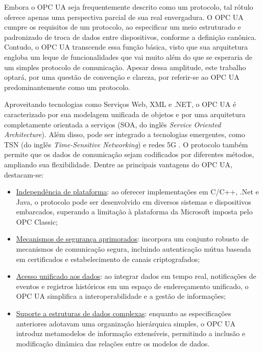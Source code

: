         Embora o OPC UA seja frequentemente descrito como um protocolo, tal rótulo oferece apenas uma perspectiva parcial de sua real envergadura. O OPC UA cumpre os requisitos de um protocolo, ao especificar um meio estruturado e padronizado de troca de dados entre dispositivos, conforme a definição canônica. Contudo, o OPC UA transcende essa função básica, visto que sua arquitetura engloba um leque de funcionalidades que vai muito além do que se esperaria de um simples protocolo de comunicação. Apesar dessa amplitude, este trabalho optará, por uma questão de convenção e clareza, por referir-se ao OPC UA predominantemente como um protocolo.

        Aproveitando tecnologias como Serviços Web, XML e .NET, o OPC UA é caracterizado por sua modelagem unificada de objetos e por uma arquitetura completamente orientada a serviços (SOA, do inglês \textit{Service Oriented Architecture}). Além disso, pode ser integrado a tecnologias emergentes, como TSN (do inglês \textit{Time-Sensitive Networking}) e redes 5G \cite{han2022}. O protocolo também permite que os dados de comunicação sejam codificados por diferentes métodos, ampliando sua flexibilidade. Dentre as principais vantagens do OPC UA, destacam-se:
        
        \begin{itemize}
            \item \underline{Independência de plataforma}: ao oferecer implementações em C/C++, .Net e Java, o protocolo pode ser desenvolvido em diversos sistemas e dispositivos embarcados, superando a limitação à plataforma da Microsoft imposta pelo OPC Classic;
            \item \underline{Mecanismos de segurança aprimorados}: incorpora um conjunto robusto de mecanismos de comunicação segura, incluindo autenticação mútua baseada em certificados e estabelecimento de canais criptografados;
            \item \underline{Acesso unificado aos dados}: ao integrar dados em tempo real, notificações de eventos e registros históricos em um espaço de endereçamento unificado, o OPC UA simplifica a interoperabilidade e a gestão de informações;
            \item \underline{Suporte a estruturas de dados complexas}: enquanto as especificações anteriores adotavam uma organização hierárquica simples, o OPC UA introduz metamodelos de informação extensíveis, permitindo a inclusão e modificação dinâmica das relações entre os modelos de dados.
        \end{itemize}
        
